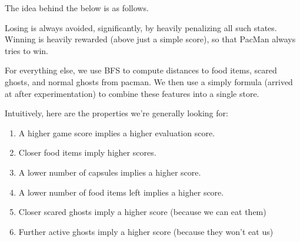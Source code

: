 \documentclass[12pt]{article}
\begin{document}
\begin{enumerate}[label=(\alph*)]
  The idea behind the below is as follows.

    Losing is always avoided, significantly, by heavily penalizing all such states.
    Winning is heavily rewarded (above just a simple score), so that PacMan always tries to win.

    For everything else, we use BFS to compute distances to food items, scared ghosts, and
    normal ghosts from pacman. We then use a simply formula (arrived at after experimentation)
    to combine these features into a single store.

    Intuitively, here are the properties we're generally looking for:
    \begin{enumerate}
      \item A higher game score implies a higher evaluation score.
      \item Closer food items imply higher scores.
      \item A lower number of capsules implies a higher score.
      \item A lower number of food items left implies a higher score.
      \item Closer scared ghosts imply a higher score (because we can eat them)
      \item Further active ghosts imply a higher score (because they won't eat us)
    \end{enumerate}
\end{enumerate}
\end{document}
